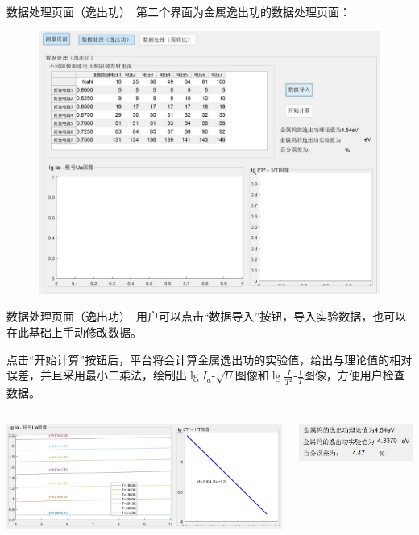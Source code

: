 \documentclass{beamer}
\begin{document}
    \begin{frame}{数据处理页面（逸出功）}{\thesection \, \secname}
        第二个界面为金属逸出功的数据处理页面：
        \begin{figure}
            \centering
            \includegraphics[scale=0.28]{gallery/pic4.jpg}
        \end{figure}
    \end{frame}
    \begin{frame}{数据处理页面（逸出功）}{\thesection \, \secname}
    用户可以点击“数据导入”按钮，导入实验数据，也可以在此基础上手动修改数据。

    点击“开始计算”按钮后，平台将会计算金属逸出功的实验值，给出与理论值的相对误差，并且采用最小二乘法，绘制出$\lg I_a$-$\sqrt{U}$图像和$\lg \frac{I}{T^2}$-$\frac{1}{T}$图像，方便用户检查数据。

        \begin{columns}
            \begin{column}{0.4\textwidth}
                \includegraphics[scale=0.27]{gallery/pic5.jpg}
            \end{column}
            \begin{column}{0.4\textwidth}
                \includegraphics[scale=0.8]{gallery/pic6.jpg}
            \end{column}
        \end{columns}
    \end{frame}
\end{document}
